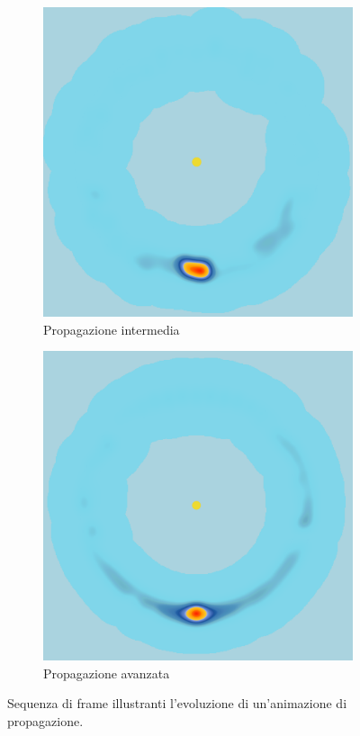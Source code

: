 \begin{figure}[htbp]
\begin{subfigure}{0.32\textwidth}
        \includegraphics[width=\linewidth]{images/propagation-2.png}
        \caption{Propagazione intermedia} %
        \label{fig:propagation-frame-2} %
    \end{subfigure}
    \hfill %
    \begin{subfigure}{0.32\textwidth}
        \centering
        \includegraphics[width=\linewidth]{images/propagation-3.png}
        \caption{Propagazione avanzata} %
        \label{fig:propagation-frame-3} %
    \end{subfigure}
    
    \caption{Sequenza di frame illustranti l'evoluzione di un'animazione di propagazione.} %
    \label{fig:propagation-animation-overview} %
\end{figure}